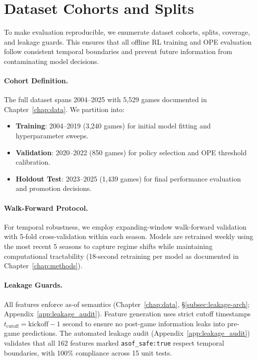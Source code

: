 \section{Dataset Cohorts and Splits}\label{sec:dataset-cohorts}
To make evaluation reproducible, we enumerate dataset cohorts, splits, coverage, and leakage guards. This ensures that all offline RL training and OPE evaluation follow consistent temporal boundaries and prevent future information from contaminating model decisions.

\paragraph{Cohort Definition.}
The full dataset spans 2004--2025 with 5,529 games documented in Chapter~\ref{chap:data}. We partition into:
\begin{itemize}
  \item \textbf{Training}: 2004--2019 (3,240 games) for initial model fitting and hyperparameter sweeps.
  \item \textbf{Validation}: 2020--2022 (850 games) for policy selection and OPE threshold calibration.
  \item \textbf{Holdout Test}: 2023--2025 (1,439 games) for final performance evaluation and promotion decisions.
\end{itemize}

\paragraph{Walk-Forward Protocol.}
For temporal robustness, we employ expanding-window walk-forward validation with 5-fold cross-validation within each season. Models are retrained weekly using the most recent 5 seasons to capture regime shifts while maintaining computational tractability (18-second retraining per model as documented in Chapter~\ref{chap:methods}).

\paragraph{Leakage Guards.}
All features enforce as-of semantics (Chapter~\ref{chap:data}, \S\ref{subsec:leakage-arch}; Appendix~\ref{app:leakage_audit}). Feature generation uses strict cutoff timestamps $t_{\text{cutoff}} = \text{kickoff} - 1\text{ second}$ to ensure no post-game information leaks into pre-game predictions. The automated leakage audit (Appendix~\ref{app:leakage_audit}) validates that all 162 features marked \texttt{asof\_safe:true} respect temporal boundaries, with 100\% compliance across 15 unit tests.

